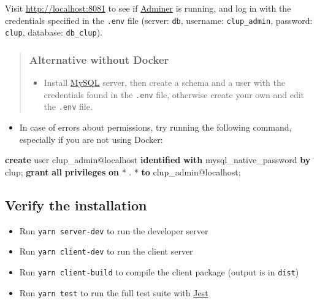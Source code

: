 \documentclass[
]{article}
\newenvironment{Shaded}{}{}
\newcommand{\FunctionTok}[1]{\textcolor[rgb]{0.02,0.16,0.49}{#1}}
\newcommand{\KeywordTok}[1]{\textcolor[rgb]{0.00,0.44,0.13}{\textbf{#1}}}
\newcommand{\NormalTok}[1]{#1}
\newcommand{\OperatorTok}[1]{\textcolor[rgb]{0.40,0.40,0.40}{#1}}
\newcommand{\StringTok}[1]{\textcolor[rgb]{0.25,0.44,0.63}{#1}}
\providecommand{\tightlist}{%
  \setlength{\itemsep}{0pt}\setlength{\parskip}{0pt}}
\begin{document}
Visit \url{http://localhost:8081} to see if
\href{https://www.adminer.org}{Adminer} is running, and log in with the
credentials specified in the \texttt{.env} file (server: \texttt{db},
username: \texttt{clup\_admin}, password: \texttt{clup}, database:
\texttt{db\_clup}).

\begin{quote}
\hypertarget{alternative-without-docker}{%
\subsubsection{Alternative without
Docker}\label{alternative-without-docker}}

\begin{itemize}
\tightlist
\item
  Install \href{https://www.mysql.com}{MySQL} server, then create a
  schema and a user with the credentials found in the \texttt{.env}
  file, otherwise create your own and edit the \texttt{.env} file.
\end{itemize}
\end{quote}

\begin{itemize}
\tightlist
\item
  In case of errors about permissions, try running the following
  command, especially if you are not using Docker:
\end{itemize}

\begin{Shaded}
\begin{Highlighting}[]
\KeywordTok{create} \FunctionTok{user}\NormalTok{ clup\_admin@localhost }\KeywordTok{identified} \KeywordTok{with}\NormalTok{ mysql\_native\_password }\KeywordTok{by} \StringTok{\textquotesingle{}clup\textquotesingle{}}\NormalTok{;}
\KeywordTok{grant} \KeywordTok{all} \KeywordTok{privileges} \KeywordTok{on} \OperatorTok{*}\NormalTok{ . }\OperatorTok{*} \KeywordTok{to}\NormalTok{ clup\_admin@localhost;}
\end{Highlighting}
\end{Shaded}

\hypertarget{verify-the-installation}{%
\subsection{Verify the installation}\label{verify-the-installation}}

\begin{itemize}
\tightlist
\item
  Run \texttt{yarn\ server-dev} to run the developer server
\item
  Run \texttt{yarn\ client-dev} to run the client server
\item
  Run \texttt{yarn\ client-build} to compile the client package (output
  is in \texttt{dist})
\item
  Run \texttt{yarn\ test} to run the full test suite with
  \href{https://jestjs.io}{Jest}
\end{itemize}
\end{document}
